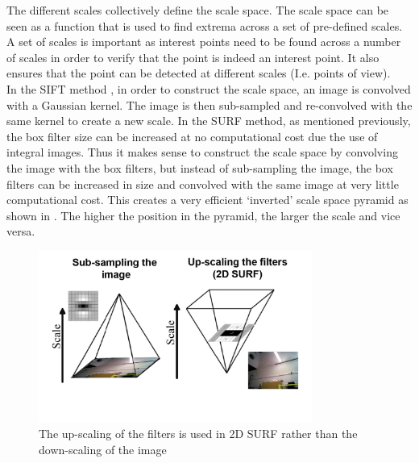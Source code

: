 \documentclass[11pt]{report}
\begin{document}
The different scales collectively define the scale space. The scale space can be seen as a function that is used to find extrema across a set of pre-defined scales. A set of scales is important as interest points need to be found across a number of scales in order to verify that the point is indeed an interest point. It also ensures that the point can be detected at different scales (I.e. points of view).\\

In the SIFT method \cite{Lowe2004}, in order to construct the scale space, an image is convolved with a Gaussian kernel. The image is then sub-sampled and re-convolved with the same kernel to create a new scale. In the SURF method, as mentioned previously, the box filter size can be increased at no computational cost due the use of integral images. Thus it makes sense to construct the scale space by convolving the image with the box filters, but instead of sub-sampling the image, the box filters can be increased in size and convolved with the same image at very little computational cost. This creates a very efficient `inverted' scale space pyramid as shown in  \cite{Evans2009}. The higher the position in the pyramid, the larger the scale and vice versa. \\

\begin{figure}[h!] 
  \centering
    \includegraphics[width=0.8\textwidth]{../Drawings/methods/SURF2D_Image_pyramid.jpg}
    \caption{The up-scaling of the filters is used in 2D SURF rather than the down-scaling of the image}
    \label{fig:scaleSpace}
\end{figure}
\end{document}
